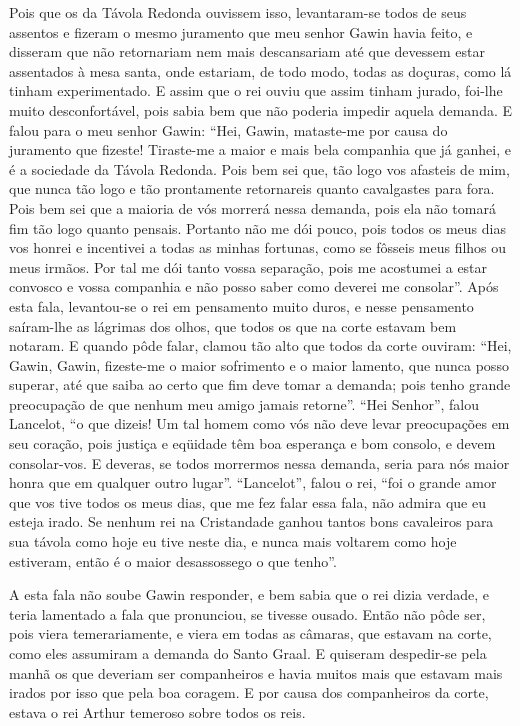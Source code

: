 Pois que os da Távola Redonda ouvissem isso, levantaram-se todos de seus
assentos e fizeram o mesmo juramento que meu senhor Gawin havia feito, e
disseram que não retornariam nem mais descansariam até que devessem estar
assentados à mesa santa, onde estariam, de todo modo, todas as doçuras, como lá
tinham experimentado. E assim que o rei ouviu que assim tinham jurado, foi-lhe
muito desconfortável, pois sabia bem que não poderia impedir aquela demanda. E
falou para o meu senhor Gawin: “Hei, Gawin, mataste-me por causa do juramento
que fizeste! Tiraste-me a maior e mais bela companhia que já ganhei, e é a
sociedade da Távola Redonda. Pois bem sei que, tão logo vos afasteis de mim,
que nunca tão logo e tão prontamente retornareis quanto cavalgastes para fora.
Pois bem sei que a maioria de vós morrerá nessa demanda, pois ela não tomará
fim tão logo quanto pensais. Portanto não me dói pouco, pois todos os
meus dias vos honrei e incentivei a todas as minhas fortunas, como se fôsseis
meus filhos ou meus irmãos. Por tal me dói tanto vossa separação, pois me
acostumei a estar convosco e vossa companhia e não posso saber como deverei me
consolar”. Após esta fala, levantou-se o rei em pensamento muito duros,
e nesse pensamento saíram-lhe as lágrimas dos olhos, que todos os que na corte
estavam bem notaram. E quando pôde falar, clamou tão alto que todos da corte
ouviram: “Hei, Gawin, Gawin, fizeste-me o maior sofrimento e o maior lamento,
que nunca posso superar, até que saiba ao certo que fim deve tomar a demanda;
pois tenho grande preocupação de que nenhum meu amigo jamais retorne”. “Hei
Senhor”, falou Lancelot, “o que dizeis! Um tal homem como vós não deve levar
preocupações em seu coração, pois justiça e eqüidade têm boa esperança e bom
consolo, e devem consolar-vos. E deveras, se todos morrermos nessa demanda,
seria para nós maior honra que em qualquer outro lugar”. “Lancelot”, falou o
rei, “foi o grande amor que vos tive todos os meus dias, que me fez falar essa
fala, não admira que eu esteja irado. Se nenhum rei na Cristandade ganhou
tantos bons cavaleiros para sua távola como hoje eu tive neste dia, e nunca
mais voltarem como hoje estiveram, então é o maior desassossego o que tenho”. 

A esta fala não soube Gawin responder, e bem sabia que o rei dizia verdade, e
teria lamentado a fala que pronunciou, se tivesse ousado. Então não pôde ser,
pois viera temerariamente, e viera em todas as câmaras, que estavam na corte,
como eles assumiram a demanda do Santo Graal. E quiseram despedir-se pela manhã
os que deveriam ser companheiros e havia muitos mais que estavam mais irados
por isso que pela boa coragem. E por causa dos companheiros da corte, estava o
rei Arthur temeroso sobre todos os reis. 

